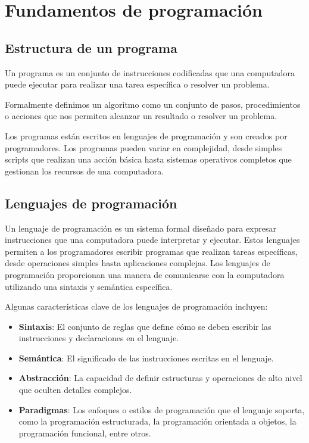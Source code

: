 \chapter{Fundamentos de programación}
\label{fundamentos-de-programaciuxf3n}


\section{Estructura de un programa}\label{estructura-de-un-programa}

Un programa es un conjunto de instrucciones codificadas que una
computadora puede ejecutar para realizar una tarea específica o resolver
un problema.

\begin{definition}[Algoritmo]
Formalmente definimos un algoritmo como un conjunto de pasos,
procedimientos o acciones que nos permiten alcanzar un resultado o
resolver un problema.  
\end{definition}

Los programas están escritos en lenguajes de programación y son creados
por programadores. Los programas pueden variar en complejidad, desde
simples scripts que realizan una acción básica hasta sistemas operativos
completos que gestionan los recursos de una computadora.


\section{Lenguajes de programación}\label{lenguajes-de-programaciuxf3n}

Un lenguaje de programación es un sistema formal diseñado para expresar
instrucciones que una computadora puede interpretar y ejecutar. Estos
lenguajes permiten a los programadores escribir programas que realizan
tareas específicas, desde operaciones simples hasta aplicaciones
complejas. Los lenguajes de programación proporcionan una manera de
comunicarse con la computadora utilizando una sintaxis y semántica
específica.

Algunas características clave de los lenguajes de programación incluyen:

\begin{itemize}
  \item \textbf{Sintaxis}: El conjunto de reglas que define cómo se deben
    escribir las instrucciones y declaraciones en el lenguaje.
  \item \textbf{Semántica}: El significado de las instrucciones escritas en el
    lenguaje.
  \item \textbf{Abstracción}: La capacidad de definir estructuras y
    operaciones de alto nivel que oculten detalles complejos.
  \item \textbf{Paradigmas}: Los enfoques o estilos de programación que el
    lenguaje soporta, como la programación estructurada, la programación
    orientada a objetos, la programación funcional, entre otros.
\end{itemize}

